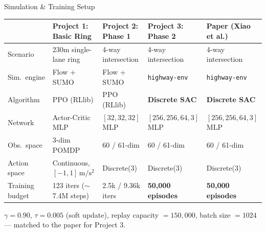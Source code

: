 \documentclass[aspectratio=169,10pt]{beamer}
\begin{document}
\begin{frame}{Simulation \& Training Setup}
    \scriptsize
    \begin{table}
    \begin{tabularx}{\textwidth}{@{}l X X X X@{}}
        \toprule
         & \textbf{Project 1: Basic Ring} & \textbf{Project 2: Phase 1} & \textbf{Project 3: Phase 2} & \textbf{Paper (Xiao et al.)} \\
        \midrule
        Scenario & 230m single-lane ring & 4-way intersection & 4-way intersection & 4-way intersection \\
        Sim.\ engine & Flow + SUMO & Flow + SUMO & \texttt{highway-env} & \texttt{highway-env} \\
        Algorithm & PPO (RLlib) & PPO (RLlib) & \textbf{Discrete SAC} & \textbf{Discrete SAC} \\
        Network & Actor-Critic MLP & $[32,32,32]$ MLP & $[256,256,64,3]$ MLP & $[256,256,64,3]$ MLP \\
        Obs.\ space & 3-dim POMDP & 60 / 61-dim & 60 / 61-dim & 60 / 61-dim \\
        Action space & Continuous, $[-1,1]\,\mathrm{m/s^2}$ & Discrete(3) & Discrete(3) & Discrete(3) \\
        Training budget & 123 iters ($\sim$7.4M steps) & 2.5k / 9.36k iters & \textbf{50{,}000 episodes} & \textbf{50{,}000 episodes} \\
        \bottomrule
    \end{tabularx}
    \end{table}
    \vspace{4pt}
    \centering \small $\gamma = 0.90$, $\tau = 0.005$ (soft update), replay capacity $=150{,}000$, batch size $=1024$ --- matched to the paper for Project 3.
\end{frame}
\end{document}

